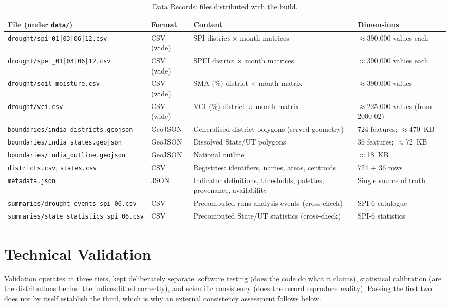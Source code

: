 \documentclass[10pt,a4paper]{article}
\begin{document}
\begin{table}[t]
\caption{Data Records: files distributed with the build.}
\label{tab:records}
\small
\begin{tabularx}{\textwidth}{@{}>{\raggedright\arraybackslash}p{}p{}X p{}@{}}
\toprule
File (under \texttt{data/}) & Format & Content & Dimensions \\
\midrule
\texttt{drought/\allowbreak spi\_01|03|06|12.csv} & CSV (wide) & SPI district $\times$ month matrices & $\approx$390{,}000 values each \\
\texttt{drought/\allowbreak spei\_01|03|06|12.csv} & CSV (wide) & SPEI district $\times$ month matrices & $\approx$390{,}000 values each \\
\texttt{drought/\allowbreak soil\_moisture.csv} & CSV (wide) & SMA (\%) district $\times$ month matrix & $\approx$390{,}000 values \\
\texttt{drought/\allowbreak vci.csv} & CSV (wide) & VCI (\%) district $\times$ month matrix & $\approx$225{,}000 values (from 2000-02) \\
\texttt{boundaries/\allowbreak india\_districts.geojson} & GeoJSON & Generalised district polygons (served geometry) & 724 features; $\approx$470~KB \\
\texttt{boundaries/\allowbreak india\_states.geojson} & GeoJSON & Dissolved State/UT polygons & 36 features; $\approx$72~KB \\
\texttt{boundaries/\allowbreak india\_outline.geojson} & GeoJSON & National outline & $\approx$18~KB \\
\texttt{districts.csv}, \texttt{states.csv} & CSV & Registries: identifiers, names, areas, centroids & 724 + 36 rows \\
\texttt{metadata.json} & JSON & Indicator definitions, thresholds, palettes, provenance, availability & Single source of truth \\
\texttt{summaries/\allowbreak drought\_events\_spi\_06.csv} & CSV & Precomputed runs-analysis events (cross-check) & SPI-6 catalogue \\
\texttt{summaries/\allowbreak state\_statistics\_spi\_06.csv} & CSV & Precomputed State/UT statistics (cross-check) & SPI-6 statistics \\
\bottomrule
\end{tabularx}
\end{table}

\section*{Technical Validation}
Validation operates at three tiers, kept deliberately separate: software testing (does the code do what it claims), statistical calibration (are the distributions behind the indices fitted correctly), and scientific consistency (does the record reproduce reality). Passing the first two does not by itself establish the third, which is why an external consistency assessment follows below.
\end{document}
